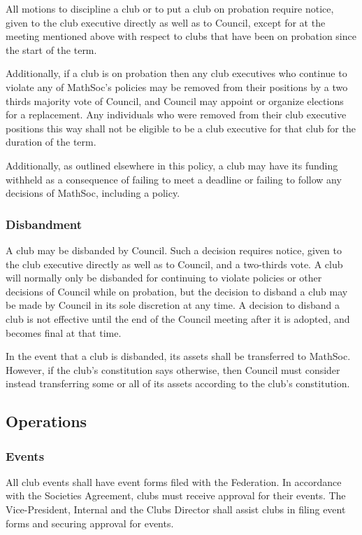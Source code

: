 All motions to discipline a club or to put a club on probation require notice,
given to the club executive directly as well as to Council, except for at the
meeting mentioned above with respect to clubs that have been on probation since
the start of the term.

Additionally, if a club is on probation then any club executives who continue
to violate any of MathSoc's policies may be removed from their positions by a
two thirds majority vote of Council, and Council may appoint or organize
elections for a replacement. Any individuals who were removed from their club
executive positions this way shall not be eligible to be a club executive for
that club for the duration of the term.

Additionally, as outlined elsewhere in this policy, a club may have its funding
withheld as a consequence of failing to meet a deadline or failing to follow any
decisions of MathSoc, including a policy.

\subsubsection{Disbandment}
A club may be disbanded by Council. Such a decision requires notice, given to
the club executive directly as well as to Council, and a two-thirds vote. A club
will normally only be disbanded for continuing to violate policies or other
decisions of Council while on probation, but the decision to disband a club may
be made by Council in its sole discretion at any time. A decision to disband a
club is not effective until the end of the Council meeting after it is adopted,
and becomes final at that time.

In the event that a club is disbanded, its assets shall be transferred to MathSoc.
However, if the club's constitution says otherwise, then Council must consider
instead transferring some or all of its assets according to the club's
constitution.

\subsection{Operations}
\subsubsection{Events}
All club events shall have event forms filed with the Federation. In accordance
with the Societies Agreement, clubs must receive approval for their events.  The
Vice-President, Internal and the Clubs Director shall assist clubs in filing
event forms and securing approval for events.

